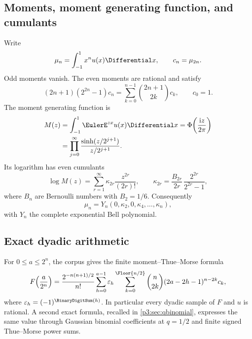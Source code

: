 \documentclass[11pt,oneside]{article}
\numberwithin{equation}{section}
\theoremstyle{definition}
\theoremstyle{remark}
\newcommand{\eps}{\varepsilon}
\begin{document}
\subsection{Moments, moment generating function, and cumulants}

Write
\begin{equation}
 \mu_n=\int_{-1}^{1}x^n u(x)\Differential x,
 \qquad c_n=\mu_{2n}.
 \label{p3:eq:moments}
\end{equation}
Odd moments vanish.  The even moments are rational and satisfy
\begin{equation}
 (2n+1)(2^{2n}-1)c_n
 =\sum_{k=0}^{n-1}\binom{2n+1}{2k}c_k,
 \qquad c_0=1.
 \label{p3:eq:moment-recurrence}
\end{equation}
The moment generating function is
\begin{align}
 M(z)
 &=\int_{-1}^{1}\EulerE^{zx}u(x)\Differential x
 =\Phi\!\left(\frac{\iu z}{2\pi}\right)\notag\\
 &=\prod_{j=0}^{\infty}
 \frac{\sinh(z/2^{j+1})}{z/2^{j+1}}.
 \label{p3:eq:mgf-product}
\end{align}
Its logarithm has even cumulants
\begin{equation}
 \log M(z)=\sum_{r=1}^{\infty}\kappa_{2r}\frac{z^{2r}}{(2r)!},
 \qquad
 \boxed{\displaystyle
 \kappa_{2r}=\frac{B_{2r}}{2r}\,
 \frac{2^{2r}}{2^{2r}-1}},
 \label{p3:eq:cumulants}
\end{equation}
where $B_n$ are Bernoulli numbers with $B_2=1/6$.  Consequently
\begin{equation}
 \mu_n=Y_n(0,\kappa_2,0,\kappa_4,\ldots,\kappa_n),
 \label{p3:eq:moment-Bell}
\end{equation}
with $Y_n$ the complete exponential Bell polynomial.

\subsection{Exact dyadic arithmetic}

For $0\le a\le2^n$, the corpus gives the finite moment--Thue--Morse formula
\begin{equation}
 F\!\left(\frac a{2^n}\right)
 =\frac{2^{-n(n+1)/2}}{n!}
 \sum_{h=0}^{a-1}\eps_h
 \sum_{k=0}^{\Floor{n/2}}
 \binom n{2k}(2a-2h-1)^{n-2k}c_k,
 \label{p3:eq:finite-F-moment}
\end{equation}
where $\eps_h=(-1)^{\BinaryDigitSum(h)}$.  In particular every dyadic sample of $F$ and
$u$ is rational.  A second exact formula, recalled in \cref{p3:sec:qbinomial}, expresses
the same value through Gaussian binomial coefficients at $q=1/2$ and finite signed
Thue--Morse power sums.
\end{document}
